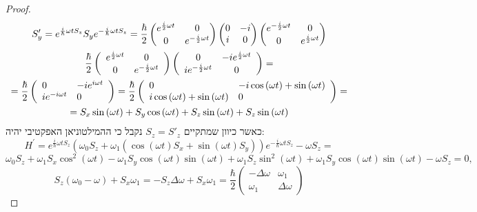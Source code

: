 \documentclass{tstextbook}
\begin{document}
\begin{proof}
$$\begin{gather}S_{y}^{\prime}=e^{\frac{i}{\hbar}\omega t S_{z}}S_{y}e^{-\frac{i}{\hbar}\omega t S_{z}}=\frac{\hbar}{2}\begin{pmatrix}e^{\frac{i}{2}\omega t}&0\\ 0&e^{-\frac{i}{2}\omega t}\end{pmatrix}\begin{pmatrix}0&-i\\ i&0\end{pmatrix}\begin{pmatrix}e^{-\frac{i}{2}\omega t}&0\\ 0&e^{\frac{i}{2}\omega t}\end{pmatrix}\\ \frac{\hbar}{2}\left(\begin{array}{c c}{{e^{\frac{i}{2}\omega t}}}&{{0}}\\ {{0}}&{{e^{-\frac{i}{2}\omega t}}}\end{array}\right)\left(\begin{array}{c c}{{0}}&{{-i e^{\frac{i}{2}\omega t}}}\\ {{i e^{-\frac{i}{2}\omega t}}}&{{0}}\end{array}\right)=\\={\frac{\hbar}{2}}\left({\begin{array}{l l}{0}&{-i e^{i\omega t}}\\ {i e^{-i\omega t}}&{0}\end{array}}\right)={\frac{\hbar}{2}}\left({\begin{array}{l l}{0}&{-i\cos\left( \omega t \right)+\sin\left( \omega t \right)}\\ {i\cos\left( \omega t \right)+\sin\left( \omega t \right)}&{0}\end{array}}\right)=\\=S_{x}\sin\left( \omega t \right)+S_{y}\cos\left( \omega t \right)+S_{z}\sin\left( \omega t \right)+S_{z}\sin\left( \omega t \right) 
\end{gather}$$
כאשר כיוון שמתקיים \(S_{z}=S'_{z}\) נקבל כי ההמילטוניאן האפקטיבי יהיה:
$$H^{\prime}=e^{\frac{i}{\hbar}\omega t S_{z}}\left(\omega_{0}S_{z}+\omega_{1}\left(\cos(\omega t)S_{x}+\sin(\omega t)S_{y}\right)\right)e^{-\frac{i}{\hbar}\omega t S_{z}}-\omega S_{z}=$$$$\omega_{0}S_{z}+\omega_{1}S_{x}\cos^{2}(\omega t)-\omega_{1}S_{y}\cos(\omega t)\sin(\omega t)+\omega_{1}S_{z}\sin^{2}(\omega t)+\omega_{1}S_{y}\cos(\omega t)\sin(\omega t)-\omega S_{z}=0,$$$$S_{z}\left(\omega_{0}-\omega\right)+S_{x}\omega_{1}=-S_{z}\Delta\omega+S_{x}\omega_{1}=\frac{\hbar}{2}\begin{pmatrix}-\Delta\omega&\omega_{1}\\ \omega_{1}&\Delta\omega\end{pmatrix}$$

\end{proof}
\end{document}
